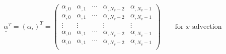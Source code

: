 $$\underline{\underline{\alpha}}^T = (\alpha_i)^T = \left(\begin{array}{ccccc}
\alpha_{,0} & \alpha_{,1} & \cdots & \alpha_{,N_v- 2} & \alpha_{,N_v-1} \\
\alpha_{,0} & \alpha_{,1} & \cdots & \alpha_{,N_v- 2} & \alpha_{,N_v-1} \\
\vdots & \vdots & & \vdots & \vdots \\
\alpha_{,0} & \alpha_{,1} & \cdots & \alpha_{,N_v- 2} & \alpha_{,N_v-1} \\
\alpha_{,0} & \alpha_{,1} & \cdots & \alpha_{,N_v- 2} & \alpha_{,N_v-1} \\
\end{array}
\right) \qquad \text{for } x \text{ advection}$$
